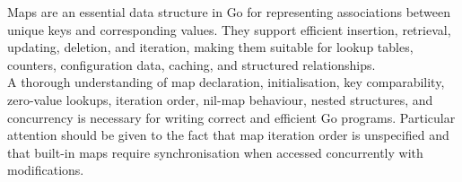 Maps are an essential data structure in Go for representing
associations between unique keys and corresponding values.
They support efficient insertion, retrieval, updating,
deletion, and iteration, making them suitable for lookup
tables, counters, configuration data, caching, and
structured relationships.\\

A thorough understanding of map declaration, initialisation,
key comparability, zero-value lookups, iteration order,
nil-map behaviour, nested structures, and concurrency
is necessary for writing correct and efficient Go programs.
Particular attention should be given to the fact that map
iteration order is unspecified and that built-in maps
require synchronisation when accessed concurrently with
modifications.\\

